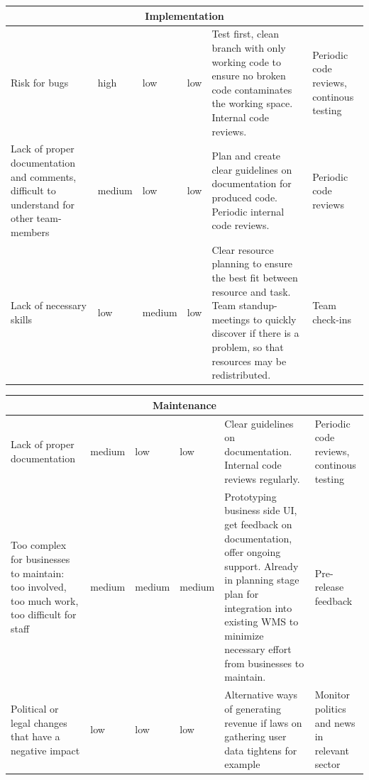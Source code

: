 \documentclass[titlepage]{article}
\begin{document}
\begin{center}
 \begin{tabular}{|p{3cm}|p{2cm}|p{2cm}|p{2cm}|p{2cm}|p{2cm}|}
 \hline
 \multicolumn{6}{|c|}{Implementation} \\
 \hline
 Risk for bugs & high & low & low & Test first, clean branch with only working code to ensure no broken code contaminates the working space. Internal code reviews. & Periodic code reviews, continous testing \\
 \hline
 Lack of proper documentation and comments, difficult to understand for other team-members & medium & low & low & Plan and create clear guidelines on documentation for produced code. Periodic internal code reviews. & Periodic code reviews \\
 \hline
 Lack of necessary skills & low & medium & low & Clear resource planning to ensure the best fit between resource and task. Team standup-meetings to quickly discover if there is a problem, so that resources may be redistributed. & Team check-ins \\
 \hline
 \end{tabular}
 \end{center}

 \begin{center}
 \begin{tabular}{|p{3cm}|p{2cm}|p{2cm}|p{2cm}|p{2cm}|p{2cm}|}
 \hline
 \multicolumn{6}{|c|}{Maintenance} \\
 \hline
 Lack of proper documentation & medium & low & low & Clear guidelines on documentation. Internal code reviews regularly. & Periodic code reviews, continous testing \\
 \hline
 Too complex for businesses to maintain: too involved, too much work, too difficult for staff & medium & medium & medium & Prototyping business side UI, get feedback on documentation, offer ongoing support. Already in planning stage plan for integration into existing WMS to minimize necessary effort from businesses to maintain. & Pre-release feedback \\
 \hline
 Political or legal changes that have a negative impact & low & low & low & Alternative ways of generating revenue if laws on gathering user data tightens for example & Monitor politics and news in relevant sector \\
 \hline
 \end{tabular}
 \end{center}
 
 
\end{document}
